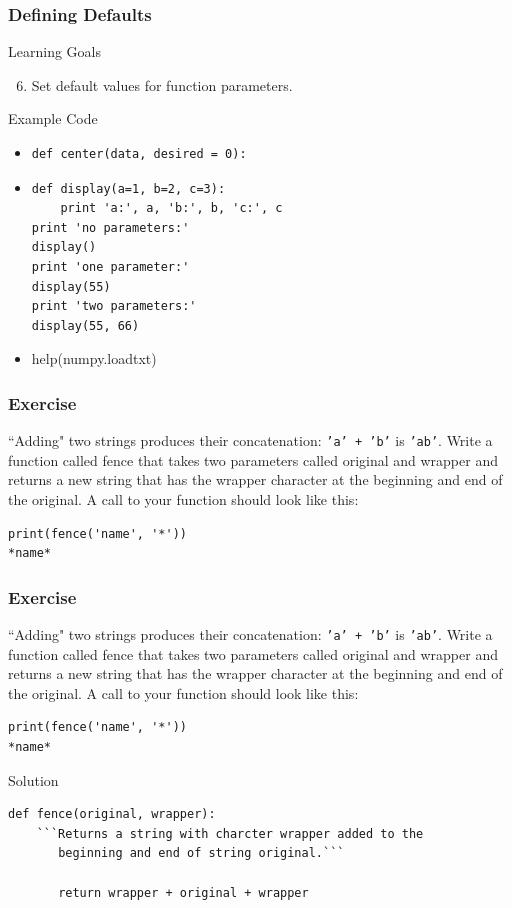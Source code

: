 \documentclass{beamer}
\begin{document}
\begin{frame}[fragile]
\frametitle{Defining Defaults}
\begin{block}{Learning Goals}
\begin{enumerate}
\setcounter{enumi}{5}
\item Set default values for function parameters.
\end{enumerate}
\end{block}
\begin{block}{Example Code}
\begin{itemize}
\item
\begin{verbatim}
def center(data, desired = 0):
\end{verbatim}
\item
\begin{verbatim}
def display(a=1, b=2, c=3):
    print 'a:', a, 'b:', b, 'c:', c
print 'no parameters:'
display()
print 'one parameter:'
display(55)
print 'two parameters:'
display(55, 66)
\end{verbatim}
\item help(numpy.loadtxt)
\end{itemize}
\end{block}
\end{frame}

\begin{frame}[fragile]
\frametitle{Exercise}

``Adding" two strings produces their concatenation: \texttt{'a' + 'b'} is \texttt{'ab'}. Write a function called fence that takes two parameters called original and wrapper and returns a new string that has the wrapper character at the beginning and end of the original. A call to your function should look like this:
\begin{verbatim}
print(fence('name', '*'))
*name*
\end{verbatim}
\end{frame}

\begin{frame}[fragile]
\frametitle{Exercise}

``Adding" two strings produces their concatenation: \texttt{'a' + 'b'} is \texttt{'ab'}. Write a function called fence that takes two parameters called original and wrapper and returns a new string that has the wrapper character at the beginning and end of the original. A call to your function should look like this:
\begin{verbatim}
print(fence('name', '*'))
*name*
\end{verbatim}

\begin{block}{Solution}
\begin{verbatim}
def fence(original, wrapper):
    ```Returns a string with charcter wrapper added to the
       beginning and end of string original.```

       return wrapper + original + wrapper
\end{verbatim}
\end{block}
\end{frame}
\end{document}
